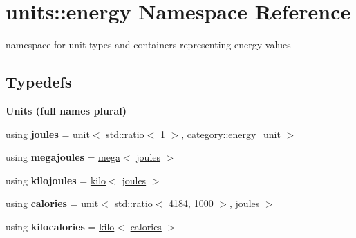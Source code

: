 \hypertarget{namespaceunits_1_1energy}{}\section{units\+:\+:energy Namespace Reference}
\label{namespaceunits_1_1energy}


namespace for unit types and containers representing energy values  


\subsection*{Typedefs}
\begin{Indent}{\bf Units (full names plural)}\par
\begin{DoxyCompactItemize}
\item 
\hypertarget{namespaceunits_1_1energy_a563a3375b8d6ebc38168af19c2c6af07}{}using {\bfseries joules} = \hyperlink{structunits_1_1unit}{unit}$<$ std\+::ratio$<$ 1 $>$, \hyperlink{namespaceunits_1_1category_a20ac4baa3d6500112b49b00ef502aba1}{category\+::energy\+\_\+unit} $>$\label{namespaceunits_1_1energy_a563a3375b8d6ebc38168af19c2c6af07}

\item 
\hypertarget{namespaceunits_1_1energy_ae438e28db7ce98847af3d985048702bf}{}using {\bfseries megajoules} = \hyperlink{group___unit_manipulators_gab1e685fcf4dd9478ed3d688f7af50842}{mega}$<$ \hyperlink{structunits_1_1unit}{joules} $>$\label{namespaceunits_1_1energy_ae438e28db7ce98847af3d985048702bf}

\item 
\hypertarget{namespaceunits_1_1energy_aaae216c6886362c9ed053a1f6cfd342c}{}using {\bfseries kilojoules} = \hyperlink{group___unit_manipulators_ga89965a45aaa6689548b9c53858759c5e}{kilo}$<$ \hyperlink{structunits_1_1unit}{joules} $>$\label{namespaceunits_1_1energy_aaae216c6886362c9ed053a1f6cfd342c}

\item 
\hypertarget{namespaceunits_1_1energy_adf96aa446048938f5e8eb7a4eafb3097}{}using {\bfseries calories} = \hyperlink{structunits_1_1unit}{unit}$<$ std\+::ratio$<$ 4184, 1000 $>$, \hyperlink{structunits_1_1unit}{joules} $>$\label{namespaceunits_1_1energy_adf96aa446048938f5e8eb7a4eafb3097}

\item 
\hypertarget{namespaceunits_1_1energy_a875790096fcf221b05d35b57f10f1433}{}using {\bfseries kilocalories} = \hyperlink{group___unit_manipulators_ga89965a45aaa6689548b9c53858759c5e}{kilo}$<$ \hyperlink{structunits_1_1unit}{calories} $>$\label{namespaceunits_1_1energy_a875790096fcf221b05d35b57f10f1433}


\end{DoxyCompactItemize}
\end{Indent}
